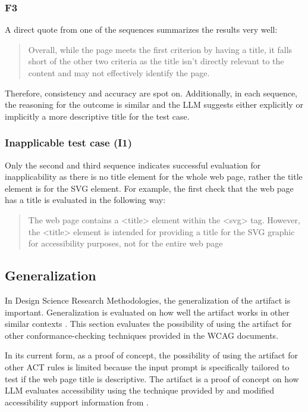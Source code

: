 \subsubsection{F3}

A direct quote from one of the sequences summarizes the results very well: \blockquote{Overall, while the page meets the first criterion by having a title, it falls short of the other two criteria as the title isn't directly relevant to the content and may not effectively identify the page.}. Therefore, consistency and accuracy are spot on. Additionally, in each sequence, the reasoning for the outcome is similar and the LLM suggests either explicitly or implicitly a more descriptive title for the test case.

\subsubsection{Inapplicable test case (I1)}

Only the second and third sequence indicates successful evaluation for inapplicability as there is no title element for the whole web page, rather the title element is for the SVG element. For example, the first check that the web page has a title is evaluated in the following way: \blockquote{The web page contains a <title> element within the <svg> tag. However, the <title> element is intended for providing a title for the SVG graphic for accessibility purposes, not for the entire web page}.

\subsection{Generalization}

In Design Science Research Methodologies, the generalization of the artifact is important. Generalization is evaluated on how well the artifact works in other similar contexts \citep{design_science_eval}. This section evaluates the possibility of using the artifact for other conformance-checking techniques provided in the WCAG documents.

In its current form, as a proof of concept, the possibility of using the artifact for other ACT rules is limited because the input prompt is specifically tailored to test if the web page title is descriptive. The artifact is a proof of concept on how LLM evaluates accessibility using the technique provided by \textcite{g88} and modified accessibility support information from \textcite{act_rule_g88}. 

